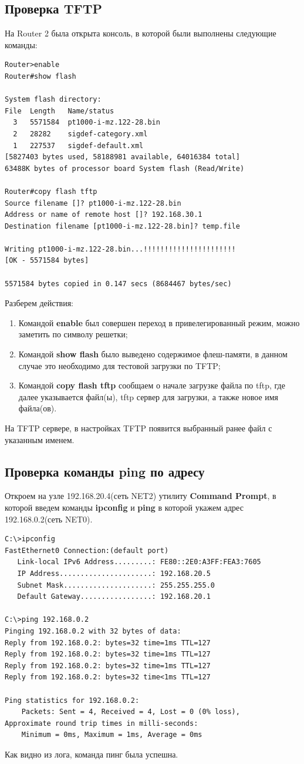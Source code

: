\documentclass[14pt,a4paper,report]{report}
\begin{document}
\subsection{Проверка TFTP}
На Router 2 была открыта консоль, в которой были выполнены следующие команды:
\begin{lstlisting}[language={}]
Router>enable
Router#show flash

System flash directory:
File  Length   Name/status
  3   5571584  pt1000-i-mz.122-28.bin
  2   28282    sigdef-category.xml
  1   227537   sigdef-default.xml
[5827403 bytes used, 58188981 available, 64016384 total]
63488K bytes of processor board System flash (Read/Write)

Router#copy flash tftp
Source filename []? pt1000-i-mz.122-28.bin
Address or name of remote host []? 192.168.30.1
Destination filename [pt1000-i-mz.122-28.bin]? temp.file

Writing pt1000-i-mz.122-28.bin...!!!!!!!!!!!!!!!!!!!!!!
[OK - 5571584 bytes]

5571584 bytes copied in 0.147 secs (8684467 bytes/sec)
\end{lstlisting}
Разберем действия:
\begin{enumerate}
\item Командой \textbf{enable} был совершен переход в привелегированный режим, можно заметить по символу решетки;
\item Командой \textbf{show flash} было выведено содержимое флеш-памяти, в данном случае это необходимо для тестовой загрузки по TFTP;
\item Командой \textbf{copy flash tftp} сообщаем о начале загрузке файла по tftp, где далее указывается файл(ы), tftp сервер для загрузки, а также новое имя файла(ов). 
\end{enumerate}
На TFTP сервере, в настройках TFTP появится выбранный ранее файл с указанным именем.

\subsection{Проверка команды ping по адресу}
Откроем на узле 192.168.20.4(сеть NET2) утилиту \textbf{Command Prompt}, в которой введем команды \textbf{ipconfig} и \textbf{ping} в которой укажем адрес 192.168.0.2(сеть NET0).
\begin{lstlisting}[language={}]
C:\>ipconfig
FastEthernet0 Connection:(default port)
   Link-local IPv6 Address.........: FE80::2E0:A3FF:FEA3:7605
   IP Address......................: 192.168.20.5
   Subnet Mask.....................: 255.255.255.0
   Default Gateway.................: 192.168.20.1

C:\>ping 192.168.0.2
Pinging 192.168.0.2 with 32 bytes of data:
Reply from 192.168.0.2: bytes=32 time=1ms TTL=127
Reply from 192.168.0.2: bytes=32 time=1ms TTL=127
Reply from 192.168.0.2: bytes=32 time=1ms TTL=127
Reply from 192.168.0.2: bytes=32 time<1ms TTL=127

Ping statistics for 192.168.0.2:
    Packets: Sent = 4, Received = 4, Lost = 0 (0% loss),
Approximate round trip times in milli-seconds:
    Minimum = 0ms, Maximum = 1ms, Average = 0ms
\end{lstlisting}
Как видно из лога, команда пинг была успешна.
\end{document}
